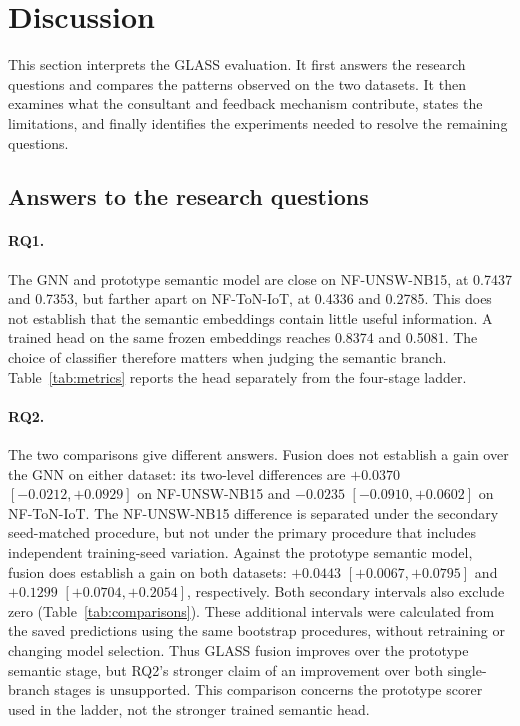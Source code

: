 \section{Discussion}
\label{sec:discussion}

This section interprets the GLASS evaluation. It first answers the research questions and compares the patterns observed on the two datasets. It then examines what the consultant and feedback mechanism contribute, states the limitations, and finally identifies the experiments needed to resolve the remaining questions.

\subsection{Answers to the research questions}
\label{sec:disc-rqs}

\paragraph{RQ1.} The GNN and prototype semantic model are close on NF-UNSW-NB15, at 0.7437 and 0.7353, but farther apart on NF-ToN-IoT, at 0.4336 and 0.2785. This does not establish that the semantic embeddings contain little useful information. A trained head on the same frozen embeddings reaches 0.8374 and 0.5081. The choice of classifier therefore matters when judging the semantic branch. Table~\ref{tab:metrics} reports the head separately from the four-stage ladder.

\paragraph{RQ2.} The two comparisons give different answers. Fusion does not establish a gain over the GNN on either dataset: its two-level differences are $+0.0370$ $[-0.0212, +0.0929]$ on NF-UNSW-NB15 and $-0.0235$ $[-0.0910, +0.0602]$ on NF-ToN-IoT. The NF-UNSW-NB15 difference is separated under the secondary seed-matched procedure, but not under the primary procedure that includes independent training-seed variation. Against the prototype semantic model, fusion does establish a gain on both datasets: $+0.0443$ $[+0.0067, +0.0795]$ and $+0.1299$ $[+0.0704, +0.2054]$, respectively. Both secondary intervals also exclude zero (Table~\ref{tab:comparisons}). These additional intervals were calculated from the saved predictions using the same bootstrap procedures, without retraining or changing model selection. Thus GLASS fusion improves over the prototype semantic stage, but RQ2's stronger claim of an improvement over both single-branch stages is unsupported. This comparison concerns the prototype scorer used in the ladder, not the stronger trained semantic head.

